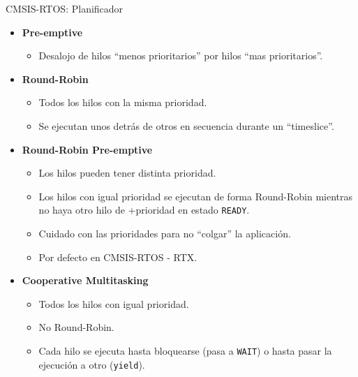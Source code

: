 \begin{frame}{CMSIS-RTOS: Planificador}
    \begin{itemize}
      \item \textbf{Pre-emptive}
          \begin{itemize}
            \item Desalojo de hilos “menos prioritarios” por hilos “mas prioritarios”.
          \end{itemize}
      \item \textbf{Round-Robin}
          \begin{itemize}
            \item Todos los hilos con la misma prioridad.
            \item Se ejecutan unos detrás de otros en secuencia durante un “timeslice”.
      \end{itemize}
      \item \textbf{Round-Robin Pre-emptive}
          \begin{itemize}
            \item Los hilos pueden tener distinta prioridad.
            \item Los hilos con igual prioridad se ejecutan de forma Round-Robin mientras no haya otro hilo de +prioridad en estado \texttt{READY}.
            \item Cuidado con las prioridades para no “colgar” la aplicación.
            \item Por defecto en CMSIS-RTOS - RTX.
      \end{itemize}
      \item \textbf{Cooperative Multitasking}
          \begin{itemize}
            \item Todos los hilos con igual prioridad.
            \item No Round-Robin.
            \item Cada hilo se ejecuta hasta bloquearse (pasa a \texttt{WAIT}) o hasta pasar la ejecución a otro (\texttt{yield}).
          \end{itemize}
    \end{itemize}
\end{frame}


